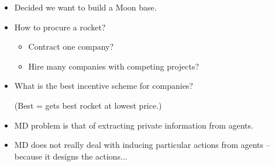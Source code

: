 \documentclass[english,handout]{beamer}		%
\def\lyxframeend{} %
\begin{document}
\begin{itemize}
	\item Decided we want to build a Moon base.
	\item How to procure a rocket?
	\begin{itemize}
		\item Contract one company?
		\item Hire many companies with competing projects?
	\end{itemize}
	\item What is the best incentive scheme for companies? 
	
	(Best = gets best rocket at lowest price.)
\end{itemize}
\lyxframeend


\begin{itemize}
	\item MD problem is that of extracting private information from agents.
	
	\item MD does not really deal with inducing particular actions from agents -- because it designs the actions...
\end{itemize}
\lyxframeend


%	
\end{document}
